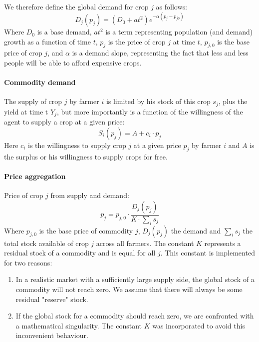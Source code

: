 \documentclass[a4paper,12pt]{article} %
\begin{document}
We therefore define the global demand for crop $j$ as follows:
\begin{equation}
    D_j(p_j) = \left( D_0 + at^2 \right) e^{-\alpha (p_j-p_{j0})}
\end{equation}
Where $D_0$ is a base demand, $at^2$ is a term representing population (and demand) growth as a function of time $t$, $p_j$ is the price of crop $j$ at time $t$, $p_{j,0}$ is the base price of crop $j$, and $\alpha$ is a demand slope, representing the fact that less and less people will be able to afford expensive crops.

\paragraph{Commodity demand}
The supply of crop $j$ by farmer $i$ is limited by his stock of this crop $s_j$, plus the yield at time t $Y_j$, but more importantly is a function of the willingness of the agent to supply a crop at a given price:
\begin{equation}
    S_i(p_j) = A + c_i \cdot p_j
\end{equation}
Here $c_i$ is the willingness to supply crop $j$  at a given price $p_j$ by farmer $i$ and $A$ is the surplus or his willingness to supply crops for free.

\paragraph{Price aggregation}
Price of crop $j$ from supply and demand:
\begin{equation}
    p_j =  p_{j,0} \cdot \frac{D_j(p_j)}{K \cdot \sum_i s_j}
\end{equation}
Where $p_{j,0}$ is the base price of commodity $j$, $D_j(p_j)$ the demand and $\sum_i s_j$ the total stock available of crop $j$ across all farmers. The constant $K$ represents a residual stock of a commodity and is equal for all $j$. This constant is implemented for two reasons:
\begin{enumerate}
    \item In a realistic market with a sufficiently large supply side, the global stock of a commodity will not reach zero. We assume that there will always be some residual "reserve" stock. 
    \item If the global stock for a commodity should reach zero, we are confronted with a mathematical singularity. The constant $K$ was incorporated to avoid this inconvenient behaviour. 
\end{enumerate}
\end{document}
